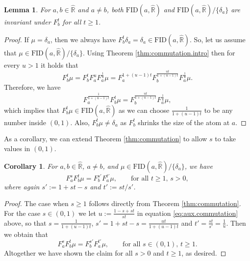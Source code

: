 \documentclass[reqno,11pt]{amsart}
\newtheorem{lemma}[theorem]{Lemma}
\newtheorem{corollary}[theorem]{Corollary}
\theoremstyle{remark}
\newcommand{\rr}{\mathbb{R}}
\newcommand{\pfreepower}[2]{F_{#1}^{#2}}
\begin{document}
\begin{lemma}
    For $ a,b\in \hat{\rr} $ and $a\neq b$, both $ \text{FID}(a,\hat{\rr}) $ and $\text{FID}(a,\hat{\rr})/\{\delta_a\}$ are invariant under $ \pfreepower{b}{t} $ for all $t\geq 1$.
\end{lemma}
\begin{proof}
If $ \mu=\delta_a $, then we always have $ \pfreepower{b}{t}\delta_a=\delta_a \in \text{FID}(a,\hat{\rr})$. So, let us assume that $ \mu\in \text{FID}(a,\hat{\rr})/\{\delta_a\} $. Using Theorem \ref{thm:commutation.intro} then for every $u>1$ it holds that
    $$ \pfreepower{b}{t}\mu = \pfreepower{b}{t}\pfreepower{a}{u}\pfreepower{a}{\frac{1}{u}}\mu = \pfreepower{a}{1+(u-1)t}\pfreepower{b}{\frac{ut}{1+(u-1)t}}\pfreepower{a}{\frac{1}{u}}\mu.$$
    Therefore, we have 
    \begin{equation}
    \label{eq:aux.commutation}
    \pfreepower{a}{\frac{1}{1+(u-1)t}}\pfreepower{b}{t}\mu = \pfreepower{b}{\frac{ut}{1+(u-1)t}}\pfreepower{a}{\frac{1}{u}}\mu,
    \end{equation} which implies that $ \pfreepower{b}{t}\mu\in  \text{FID}(a,\hat{\rr}) $ as we can choose $ \frac{1}{1+(u-1)t} $ to be any number inside $(0,1)$. Also, $ \pfreepower{b}{t}\mu\neq \delta_a $ as $ \pfreepower{b}{t} $ shrinks the size of the atom at $a$.
\end{proof}

As a corollary, we can extend Theorem \ref{thm:commutation} to allow $s$ to take values in $(0,1)$.

\begin{corollary}
    For $a,b\in \hat{\rr}$, $a\neq b$, and $ \mu \in \text{FID}(a,\hat{\rr})/\{\delta_a\}$, we have
     $$ \pfreepower{a}{s}\pfreepower{b}{t} \mu =\pfreepower{b}{s'}\pfreepower{a}{t'}\mu, \qquad \text{for all } t\geq 1,\, s>0, $$
     where again $ s' := 1+st-s $ and $t' := st/s'$.
\end{corollary}
\begin{proof}
The case when $s\geq 1$ follows directly from Theorem \ref{thm:commutation}. For the case $s\in(0,1)$ we let $u:=\frac{1-s+st}{st}$ in equation \eqref{eq:aux.commutation} above, so that $s=\frac{1}{1+(u-1)t}$, $ s' = 1+st-s=\frac{ut}{1+(u-1)t} $ and $t' = \frac{st}{s'}= \frac{1}{u}$. Then we obtain that 
$$ \pfreepower{a}{s}\pfreepower{b}{t} \mu =\pfreepower{b}{s'}\pfreepower{a}{t'}\mu, \qquad \text{for all } s\in (0,1),\,  t\geq 1.$$
Altogether we have shown the claim for all $s>0$ and $t\geq 1$, as desired.
\end{proof}
\end{document}
